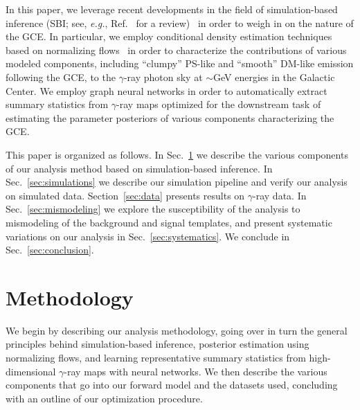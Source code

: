 \documentclass[prd,aps,10pt,nofootinbib,twocolumn,superscriptaddress,preprintnumbers,balancelastpage,longbibliography]{revtex4-1}
\begin{document}
 In this paper, we leverage recent developments in the field of simulation-based inference (SBI; see, \emph{e.g.}, Ref.~\cite{cranmer2020frontier} for a review)~\cite{Alsing:2019xrx,Brehmer:2018eca,Brehmer:2018hga,Brehmer:2018kdj,Brehmer:2020cvb,Cranmer:2015bka,cranmerFrontierSimulationbasedInference2020,durkanContrastiveLearningLikelihoodfree2020,greenbergAutomaticPosteriorTransformation2019,Hermans:2019ioj,lueckmannBenchmarkingSimulationBasedInference2021,lueckmannLikelihoodfreeInferenceEmulator2019,pacchiardiGeneralizedBayesianLikelihoodFree2021,papamakariosFastEpsilonFree2018,papamakariosSequentialNeuralLikelihood2019,wiqvistSequentialNeuralPosterior2021,zhaoValidatingConditionalDensity2021} in order to weigh in on the nature of the GCE. In particular, we employ conditional density estimation techniques based on normalizing flows~\cite{papamakarios2019normalizing,rezende2015variational} in order to characterize the contributions of various modeled components, including ``clumpy'' PS-like and ``smooth'' DM-like emission following the GCE, to the $\gamma$-ray photon sky at $\sim$GeV energies in the Galactic Center. We employ graph neural networks in order to automatically extract summary statistics from $\gamma$-ray maps optimized for the downstream task of estimating the parameter posteriors of various components characterizing the GCE.

This paper is organized as follows. In Sec.~\ref{sec:analysis} we describe the various components of our analysis method based on simulation-based inference. In Sec.~\ref{sec:simulations} we describe our simulation pipeline and verify our analysis on simulated data. Section~\ref{sec:data} presents results on \Fermi $\gamma$-ray data. In Sec.~\ref{sec:mismodeling} we explore the susceptibility of the analysis to mismodeling of the background and signal templates, and present systematic variations on our analysis in Sec.~\ref{sec:systematics}. We conclude in Sec.~\ref{sec:conclusion}.

\section{Methodology}
\label{sec:analysis}

We begin by describing our analysis methodology, going over in turn the general principles behind simulation-based inference, posterior estimation using normalizing flows, and learning representative summary statistics from high-dimensional $\gamma$-ray maps with neural networks. We then describe the various components that go into our forward model and the datasets used, concluding with an outline of our optimization procedure.
\end{document}
